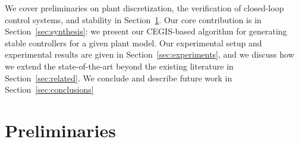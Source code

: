 \documentclass{sig-alternate-05-2015}
\newcommand{\blue}[1]{{\color{blue}#1}}
\begin{document}

We cover preliminaries on plant discretization, the verification of
closed-loop control systems, and stability in
Section~\ref{sec:preliminaries}.  Our core contribution is in
Section~\ref{sec:synthesis}: we present our CEGIS-based algorithm for
generating stable controllers for a given plant model.  Our experimental
setup and experimental results are given in Section~\ref{sec:experiments},
and we discuss how we extend the state-of-the-art beyond the existing
literature in Section~\ref{sec:related}. We conclude and describe future
work in Section~\ref{sec:conclusions}

\section{Preliminaries}\label{sec:preliminaries}

\end{document}

